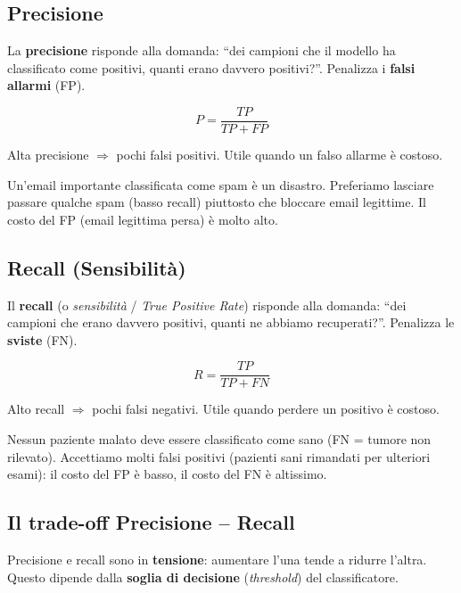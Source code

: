 \subsection{Precisione}

La \textbf{precisione} risponde alla domanda: ``dei campioni che il modello ha classificato come positivi, quanti erano davvero positivi?''. Penalizza i \textbf{falsi allarmi} (FP).

\begin{equation}
P = \frac{TP}{TP + FP}
\end{equation}

Alta precisione $\Rightarrow$ pochi falsi positivi. Utile quando un falso allarme è costoso.

\begin{exbox}
Un'email importante classificata come spam è un disastro. Preferiamo lasciare passare qualche spam (basso recall) piuttosto che bloccare email legittime. Il costo del FP (email legittima persa) è molto alto.
\end{exbox}


\subsection{Recall (Sensibilità)}
Il \textbf{recall} (o \emph{sensibilità} / \emph{True Positive Rate}) risponde alla domanda: ``dei campioni che erano davvero positivi, quanti ne abbiamo recuperati?''. Penalizza le \textbf{sviste} (FN).

\begin{equation}
R = \frac{TP}{TP + FN}
\end{equation}

Alto recall $\Rightarrow$ pochi falsi negativi. Utile quando perdere un positivo è costoso.

\begin{exbox}
Nessun paziente malato deve essere classificato come sano (FN = tumore non rilevato). Accettiamo molti falsi positivi (pazienti sani rimandati per ulteriori esami): il costo del FP è basso, il costo del FN è altissimo.
\end{exbox}

\subsection{Il trade-off Precisione -- Recall}
Precisione e recall sono in \textbf{tensione}: aumentare l'una tende a ridurre l'altra. Questo dipende dalla \textbf{soglia di decisione} (\emph{threshold}) del classificatore.

